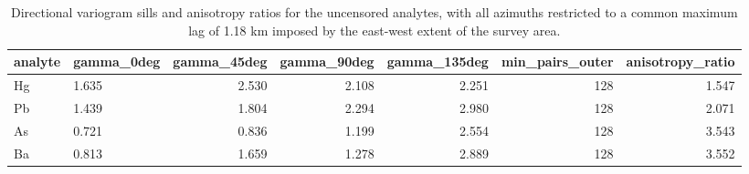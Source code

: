 \begin{table}[htbp]
\centering
\caption{Directional variogram sills and anisotropy ratios for the uncensored analytes, with all azimuths restricted to a common maximum lag of 1.18 km imposed by the east-west extent of the survey area.}
\label{tab:aniso}
\footnotesize
\begin{tabular}{llrrrrr}
\toprule
analyte & gamma\_0deg & gamma\_45deg & gamma\_90deg & gamma\_135deg & min\_pairs\_outer & anisotropy\_ratio \\
\midrule
Hg & 1.635 & 2.530 & 2.108 & 2.251 & 128 & 1.547 \\
Pb & 1.439 & 1.804 & 2.294 & 2.980 & 128 & 2.071 \\
As & 0.721 & 0.836 & 1.199 & 2.554 & 128 & 3.543 \\
Ba & 0.813 & 1.659 & 1.278 & 2.889 & 128 & 3.552 \\
\bottomrule
\end{tabular}
\end{table}
